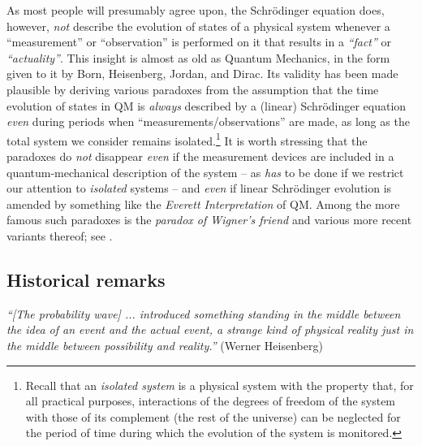 \documentclass[12pt]{article}
\begin{document}
As most people will presumably agree upon, the Schr\"odinger equation does, however, 
\textit{not} describe the evolution of states of a physical system whenever a ``measurement'' or ``observation'' is 
performed on it that results in a \textit{``fact''} or \textit{``actuality''}. This insight is almost as old as Quantum Mechanics, 
in the form given to it by Born, Heisenberg, {Jordan}, and {Dirac}. Its validity has been made 
plausible by deriving various paradoxes from the assumption that the time evolution of states in QM is \textit{always} 
described by a (linear) Schr\"odinger equation \textit{even} during periods when ``measurements/observations'' 
are made, as long as the total system we consider remains isolated.\footnote{Recall that an \textit{isolated system} 
is a physical system with the property that, for all practical purposes, interactions of the degrees of freedom of the 
system with those of its complement (the rest of the universe) can be neglected for the period of time during which 
the evolution of the system is monitored.}
It is worth stressing that the paradoxes do \textit{not} disappear \textit{even} if the measurement devices are included 
in a quantum-mechanical description of the system -- as \textit{has} to be done if we restrict our attention to 
\textit{isolated} systems -- and \textit{even} if linear Schr\"odinger evolution is amended by something like the 
\textit{Everett Interpretation} \cite{Everett} of QM. Among the more famous such paradoxes is the \textit{paradox 
of Wigner's friend} \cite{Wigner} and various more recent variants thereof; see \cite{Hardy, FR}. 

\subsection{Historical remarks}

\hspace{0.5cm}\textit{``[The probability wave] ... introduced something standing in the middle between the idea of an event and the actual event, a strange kind of physical reality just in the middle between possibility and reality.''} (Werner Heisenberg)
\end{document}
